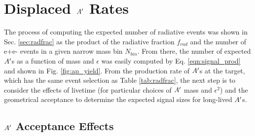 \clearpage

\section{Displaced $A^\prime$ Rates}\label{sec:aprimerate}


The process of computing the expected number of radiative events was shown in Sec. \ref{sec:radfrac} as the product of the radiative fraction $f_{rad}$ and the number of e+e- events in a given narrow mass bin $N_{bin}$. From there, the number of expected $A^\prime$s as a function of mass and $\epsilon$ was easily computed by Eq. \ref{eqn:signal_prod} and shown in Fig. \ref{fig:ap_yield}. From the production rate of $A^\prime$s at the target, which has the same event selection as Table \ref{tab:radfrac}, the next step is to consider the effects of livetime (for particular choices of $A^\prime$ mass and $\epsilon^2$) and the geometrical acceptance to determine the expected signal sizes for long-lived $A^\prime$s.%



\subsection{$A^\prime$ Acceptance Effects}\label{sec:acceptance}

